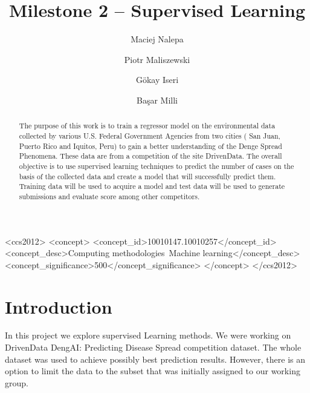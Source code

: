 \documentclass[sigconf]{acmart}
\begin{document}
\title{Milestone 2 -- Supervised Learning}

\author{Maciej Nalepa}
\affiliation{}

\author{Piotr Maliszewski}
\affiliation{}

\author{Gökay Iseri}
\affiliation{}

\author{Başar Milli}
\affiliation{}

\renewcommand{\shortauthors}{Nalepa Maliszewski Iseri Milli}

\begin{abstract}
The purpose of this work is to train a regressor model on the environmental data collected by various U.S.
Federal Government Agencies from two cities ( San Juan, Puerto Rico and Iquitos, Peru) to
gain a better understanding of the Denge Spread Phenomena.
These data are from a competition of the site DrivenData. 
The overall objective is to use supervised learning techniques to predict the number of cases on the basis of the collected data and create a model that will successfully predict them.
Training data will be used to acquire a model and test data will be used to generate submissions and evaluate score among other competitors.

\end{abstract}

\begin{CCSXML}
<ccs2012>
   <concept>
       <concept_id>10010147.10010257</concept_id>
       <concept_desc>Computing methodologies~Machine learning</concept_desc>
       <concept_significance>500</concept_significance>
       </concept>
 </ccs2012>
\end{CCSXML}



\maketitle

%
%

\section{Introduction}
In this project we explore supervised Learning methods.
We were working on DrivenData DengAI: Predicting Disease Spread competition dataset.
The whole dataset was used to achieve possibly best prediction results.
However, there is an option to limit the data to the subset that was initially assigned to our working group.
\end{document}
